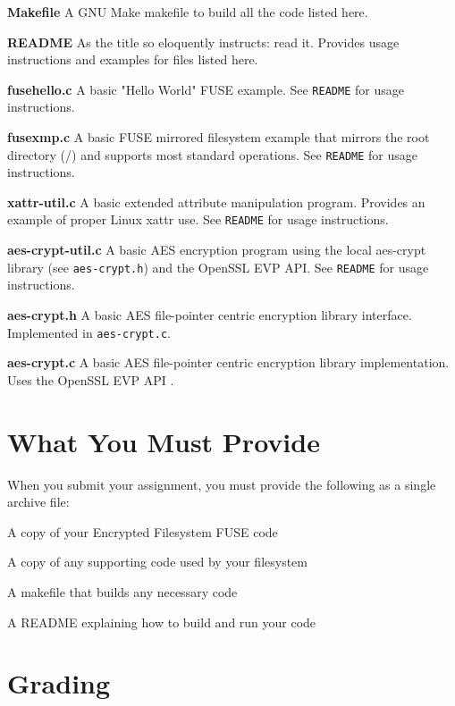 \documentclass[12pt]{article}
\newenvironment{packed_enum}{
\begin{enumerate}
  \setlength{\itemsep}{1pt}
  \setlength{\parskip}{0pt}
  \setlength{\parsep}{0pt}
}{\end{enumerate}}
\newenvironment{packed_item}{
\begin{itemize}
  \setlength{\itemsep}{1pt}
  \setlength{\parskip}{0pt}
  \setlength{\parsep}{0pt}
}{\end{itemize}}
\begin{document}
\begin{packed_item}
\item {\bf Makefile} A GNU Make makefile to build all the code listed
  here.
\item {\bf README} As the title so eloquently instructs: read
  it. Provides usage instructions and examples for files listed here.
\item {\bf fusehello.c} A basic "Hello World" FUSE example. See
  \texttt{README} for usage instructions.
\item {\bf fusexmp.c} A basic FUSE mirrored filesystem example that
  mirrors the root directory (/) and supports most standard
  operations. See \texttt{README} for usage instructions.
\item {\bf xattr-util.c} A basic extended attribute manipulation
  program. Provides an example of proper Linux xattr use.
  See \texttt{README} for usage instructions.
\item {\bf aes-crypt-util.c} A basic AES encryption program using the
  local aes-crypt library (see \texttt{aes-crypt.h}) and the OpenSSL EVP
  API\cite{openssl-evp}. See \texttt{README} for usage instructions.
\item {\bf aes-crypt.h} A basic AES file-pointer centric encryption
  library interface. Implemented in \texttt{aes-crypt.c}.
\item {\bf aes-crypt.c} A basic AES file-pointer centric encryption
  library implementation. Uses the OpenSSL EVP API \cite{openssl-evp}.
\end{packed_item}

\section{What You Must Provide}

When you submit your assignment, you must provide the following as a
single archive file:
\begin{packed_enum}
\item A copy of your Encrypted Filesystem FUSE code
\item A copy of any supporting code used by your filesystem
\item A makefile that builds any necessary code
\item A README explaining how to build and run your code
\end{packed_enum}

\section{Grading}
\end{document}
